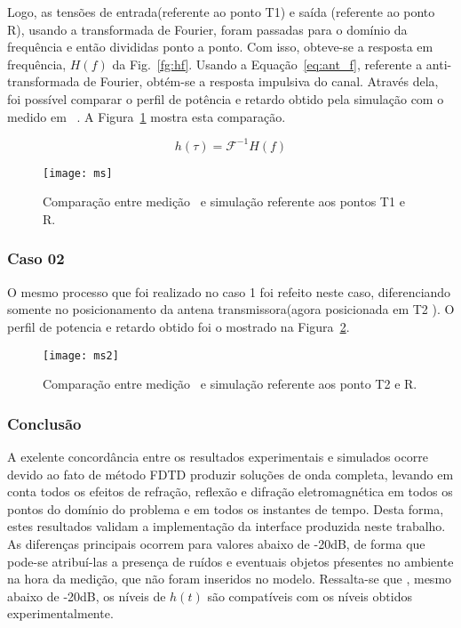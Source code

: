 	Logo, as tensões de entrada(referente ao ponto T1) e saída (referente ao ponto R), usando a transformada de Fourier, foram passadas para o domínio da frequência e então divididas ponto a ponto. Com isso, obteve-se a resposta em frequência, $H( f )$ da Fig.~\ref{fg:hf}. Usando a Equação~\ref{eq:ant_f}, referente a anti-transformada de Fourier, obtém-se a resposta impulsiva do canal. Através dela, foi possível comparar o perfil de potência e retardo obtido pela simulação com o medido em ~\cite{fabricio}. A Figura~\ref{fg:ms} mostra esta comparação.

\begin{equation}\label{eq:ant_f}
	h(\tau) = \mathcal{F}^{-1}{H(f)}
\end{equation}

\begin{figure}[!ht]
	\centering
	\texttt{[image: ms]}
	\caption{Comparação entre medição~\cite{fabricio} e simulação referente aos pontos T1 e R.}
	\label{fg:ms}
\end{figure}
	
	\subsubsection{Caso 02}
	O mesmo processo que foi realizado no caso 1 foi refeito neste caso, diferenciando somente no posicionamento da antena transmissora(agora posicionada em T2 ). O perfil de potencia e retardo obtido foi o mostrado na Figura~\ref{fg:ms2}.

\begin{figure}[!ht]
	\centering
	\texttt{[image: ms2]}
	\caption{Comparação entre medição~\cite{fabricio} e simulação referente aos ponto T2 e R.}
	\label{fg:ms2}
\end{figure}

	\subsubsection{Conclusão}
	A exelente concordância entre os resultados experimentais e simulados ocorre devido ao fato de método FDTD produzir soluções de onda completa, levando em conta todos os efeitos de refração, reflexão e difração eletromagnética em todos os pontos do domínio do problema e em todos os instantes de tempo. Desta forma, estes resultados validam a implementação da interface produzida neste trabalho. As diferenças principais ocorrem para valores abaixo de -20dB, de forma que pode-se atribuí-las a presença de ruídos e eventuais objetos pŕesentes no ambiente na hora da medição, que não foram inseridos no modelo. Ressalta-se que , mesmo abaixo de -20dB, os níveis de $h(t)$ são compatíveis com os níveis obtidos experimentalmente.
